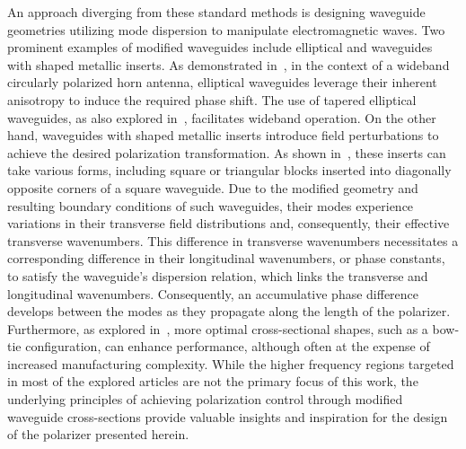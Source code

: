 \documentclass[14pt,a4paper]{ntust_report}
\begin{document}
An approach diverging from these standard methods is designing waveguide geometries utilizing mode dispersion to manipulate electromagnetic waves. Two prominent examples of modified waveguides include elliptical and waveguides with shaped metallic inserts. As demonstrated in~\parencite{yu-et-al:a-wideband-circularly-polarized-horn-antenna-with-a-tapered-elliptical-waveguide-polarizer}, in the context of a wideband circularly polarized horn antenna, elliptical waveguides leverage their inherent anisotropy to induce the required phase shift. The use of tapered elliptical waveguides, as also explored in~\parencite{yu-et-al:a-wideband-circularly-polarized-horn-antenna-with-a-tapered-elliptical-waveguide-polarizer}, facilitates wideband operation. On the other hand, waveguides with shaped metallic inserts introduce field perturbations to achieve the desired polarization transformation. As shown in~\parencite{rud-shpachenko:polarizers-on-sections-of-square-waveguides-with-inner-corner-ridges,bhardwaj-volakis:hexagonal-waveguides-new-class-of-waveguides-for-mmwave-circularly-polarized-horns,bhardwaj-volakis:hexagonal-waveguide-based-circularly-polarized-horn-antennas-for-submmwave-terahertz-band,bhardwaj-volakis:circularly-polarized-horn-antennas-for-terahertz-communications-using-differential-mode-dispersion-in-hexagonal-waveguides}, these inserts can take various forms, including square or triangular blocks inserted into diagonally opposite corners of a square waveguide. Due to the modified geometry and resulting boundary conditions of such waveguides, their modes experience variations in their transverse field distributions and, consequently, their effective transverse wavenumbers. This difference in transverse wavenumbers necessitates a corresponding difference in their longitudinal wavenumbers, or phase constants, to satisfy the waveguide's dispersion relation, which links the transverse and longitudinal wavenumbers. Consequently, an accumulative phase difference develops between the modes as they propagate along the length of the polarizer. Furthermore, as explored in~\parencite{garcia-marin-masa-campos:bowtie-shaped-radiating-element-for-single-and-dual-circular-polarization}, more optimal cross-sectional shapes, such as a bow-tie configuration, can enhance performance, although often at the expense of increased manufacturing complexity. While the higher frequency regions targeted in most of the explored articles are not the primary focus of this work, the underlying principles of achieving polarization control through modified waveguide cross-sections provide valuable insights and inspiration for the design of the polarizer presented herein.
\end{document}
